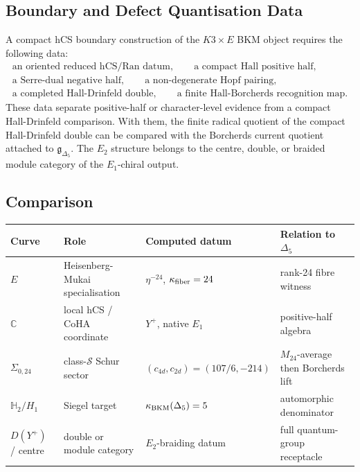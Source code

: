 \subsection*{Boundary and Defect Quantisation Data}

A compact hCS boundary construction of the \(K3\times E\) BKM object
requires the following data:
\[
\begin{gathered}
  \text{an oriented reduced hCS/Ran datum},\qquad
  \text{a compact Hall positive half},\\
  \text{a Serre-dual negative half},\qquad
  \text{a non-degenerate Hopf pairing},\\
  \text{a completed Hall-Drinfeld double},\qquad
  \text{a finite Hall-Borcherds recognition map}.
\end{gathered}
\]
These data separate positive-half or character-level evidence from a
compact Hall-Drinfeld comparison. With them, the finite radical quotient
of the compact Hall-Drinfeld double can be compared with the Borcherds
current quotient attached to \(\mathfrak g_{\Delta_5}\). The \(E_2\)
structure belongs to the centre, double, or braided module category of
the \(E_1\)-chiral output.

\subsection*{Comparison}

\begin{center}
\small
\renewcommand{\arraystretch}{1.25}
\begin{tabular}{llll}
Curve & Role & Computed datum & Relation to \(\Delta_5\) \\
\hline
\(E\) & Heisenberg-Mukai specialisation & \(\eta^{-24}\), \(\kappa_{\mathrm{fiber}}=24\) &
rank-24 fibre witness \\
\(\mathbb C\) & local hCS / CoHA coordinate & \(Y^+\), native \(E_1\) &
positive-half algebra \\
\(\Sigma_{0,24}\) & class-\(\mathcal S\) Schur sector &
\((c_{4d},c_{2d})=(107/6,-214)\) &
\(M_{24}\)-average then Borcherds lift \\
\(\mathbb H_2/H_1\) & Siegel target & \(\kappa_{\mathrm{BKM}}(\Delta_5)=5\) &
automorphic denominator \\
\(D(Y^+)\) / centre & double or module category & \(E_2\)-braiding datum &
full quantum-group receptacle \\
\end{tabular}
\end{center}

